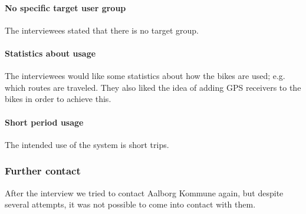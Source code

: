 \paragraph{No specific target user group}
The interviewees stated that there is no target group.

\paragraph{Statistics about usage}
The interviewees would like some statistics about how the bikes are used; e.g. which routes are traveled.
They also liked the idea of adding GPS receivers to the bikes in order to achieve this.

\paragraph{Short period usage}
The intended use of the system is short trips.

\subsubsection{Further contact}
After the interview we tried to contact Aalborg Kommune again, but despite several attempts, it was not possible to come into contact with them.
